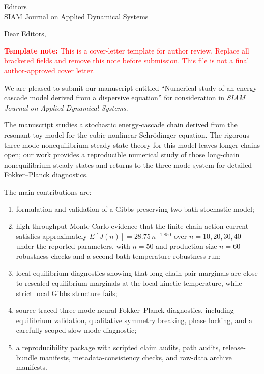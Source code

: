 \documentclass[11pt]{letter}
\date{\today}
\begin{document}
\begin{letter}{Editors\\SIAM Journal on Applied Dynamical Systems}

\opening{Dear Editors,}

\noindent\textcolor{red}{\textbf{Template note:} This is a cover-letter
template for author review.  Replace all bracketed fields and remove this note
before submission.  This file is not a final author-approved cover letter.}

\medskip

We are pleased to submit our manuscript entitled
``Numerical study of an energy cascade model derived from a dispersive
equation'' for consideration in \emph{SIAM Journal on Applied Dynamical
Systems}.

The manuscript studies a stochastic energy-cascade chain derived from the
resonant toy model for the cubic nonlinear Schr\"odinger equation.  The
rigorous three-mode nonequilibrium steady-state theory for this model leaves
longer chains open; our work provides a reproducible numerical study of those
long-chain nonequilibrium steady states and returns to the three-mode system
for detailed Fokker--Planck diagnostics.

The main contributions are:

\begin{enumerate}
  \item formulation and validation of a Gibbs-preserving two-bath stochastic
  model;
  \item high-throughput Monte Carlo evidence that the finite-chain action
  current satisfies approximately $E[J(n)] = 28.75\,n^{-1.850}$ over
  $n=10,20,30,40$ under the reported parameters, with $n=50$ and
  production-size $n=60$ robustness checks and a second bath-temperature
  robustness run;
  \item local-equilibrium diagnostics showing that long-chain pair marginals
  are close to rescaled equilibrium marginals at the local kinetic temperature,
  while strict local Gibbs structure fails;
  \item source-traced three-mode neural Fokker--Planck diagnostics, including
  equilibrium validation, qualitative symmetry breaking, phase locking, and a
  carefully scoped slow-mode diagnostic;
  \item a reproducibility package with scripted claim audits, path audits,
  release-bundle manifests, metadata-consistency checks, and raw-data archive
  manifests.
\end{enumerate}


\end{letter}
\end{document}
